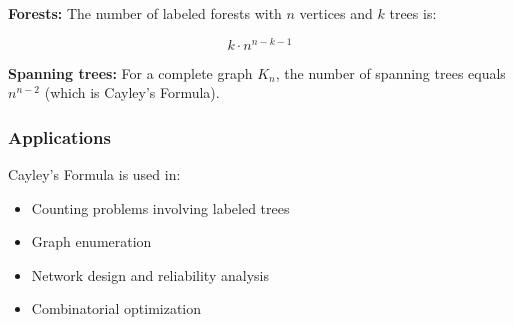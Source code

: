 \textbf{Forests:} The number of labeled forests with $n$ vertices and $k$ trees is:

\begin{equation}
    k \cdot n^{n-k-1}
\end{equation}

\textbf{Spanning trees:} For a complete graph $K_n$, the number of spanning trees equals $n^{n-2}$ (which is Cayley's Formula).

\subsubsection{Applications}

Cayley's Formula is used in:

\begin{itemize}
    \item Counting problems involving labeled trees
    \item Graph enumeration
    \item Network design and reliability analysis
    \item Combinatorial optimization
\end{itemize}
